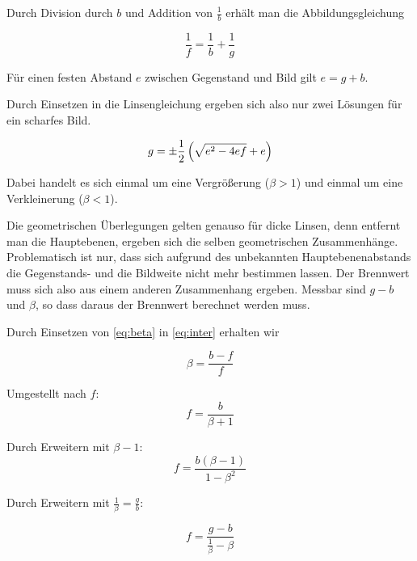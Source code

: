 \documentclass[a4paper,german,12pt,smallheadings]{scrartcl}
\begin{document}
Durch Division durch $b$ und Addition von $\frac{1}{b}$ erhält man die
Abbildungsgleichung

\begin{equation}
  \frac{1}{f} = \frac{1}{b} + \frac{1}{g}
\end{equation}


Für einen festen Abstand $e$ zwischen Gegenstand und Bild gilt $e = g+b$.

Durch Einsetzen in die Linsengleichung ergeben sich also nur zwei Lösungen für
ein scharfes Bild. %

\begin{equation}
  g = \pm \frac{1}{2} \del{\sqrt{e^2 - 4ef} + e}
\end{equation}

Dabei handelt es sich einmal um eine Vergrößerung ($\beta > 1$) und einmal um
eine Verkleinerung ($\beta < 1$). %

Die geometrischen Überlegungen gelten genauso für dicke Linsen, denn entfernt
man die Hauptebenen, ergeben sich die selben geometrischen Zusammenhänge.
Problematisch ist nur, dass sich aufgrund des unbekannten Hauptebenenabstands
die Gegenstands- und die Bildweite nicht mehr bestimmen lassen. Der Brennwert
muss sich also aus einem anderen Zusammenhang ergeben. Messbar sind $g-b$ und
$\beta$, so dass daraus der Brennwert berechnet werden muss.

Durch Einsetzen von \ref{eq:beta} in \ref{eq:inter} erhalten wir

\begin{equation}
  \beta = \frac{b-f}{f}
\end{equation}

Umgestellt nach $f$:
\begin{equation}
  f = \frac{b}{\beta + 1}
\end{equation}

Durch Erweitern mit $\beta - 1$:
\begin{equation}
  f = \frac{b(\beta - 1)}{1-\beta^2}
\end{equation}

Durch Erweitern mit $\frac{1}{\beta} = \frac{g}{b}$:

\begin{equation}
  f = \frac{g - b}{\frac{1}{\beta} - \beta}
\end{equation}
\end{document}
